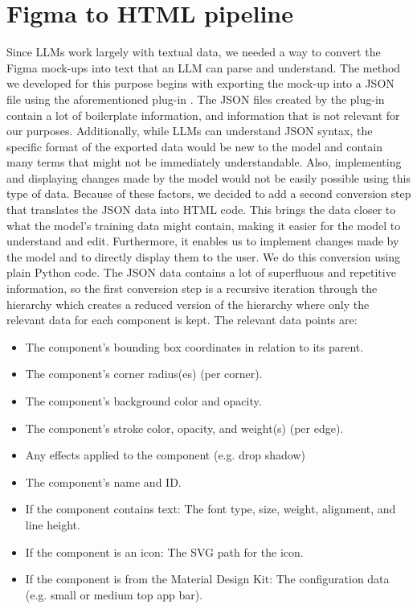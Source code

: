 \documentclass[11pt,titlepage,oneside,openany]{book}
\begin{document}
\section{Figma to HTML pipeline}\label{sec:prep}
Since LLMs work largely with textual data, we needed a way to convert the Figma mock-ups into text that an LLM can parse and understand. The method we developed for this purpose begins with exporting the mock-up into a JSON file using the aforementioned plug-in \cite{noauthor_json_nodate}. The JSON files created by the plug-in contain a lot of boilerplate information, and information that is not relevant for our purposes. Additionally, while LLMs can understand JSON syntax, the specific format of the exported data would be new to the model and contain many terms that might not be immediately understandable. Also, implementing and displaying changes made by the model would not be easily possible using this type of data. Because of these factors, we decided to add a second conversion step that translates the JSON data into HTML code. This brings the data closer to what the model's training data might contain, making it easier for the model to understand and edit. Furthermore, it enables us to implement changes made by the model and to directly display them to the user. We do this conversion using plain Python code. The JSON data contains a lot of superfluous and repetitive information, so the first conversion step is a recursive iteration through the hierarchy which creates a reduced version of the hierarchy where only the relevant data for each component is kept. The relevant data points are:
\begin{itemize}
	\item The component's bounding box coordinates in relation to its parent. 
	\item The component's corner radius(es) (per corner).
	\item The component's background color and opacity.
	\item The component's stroke color, opacity, and weight(s) (per edge).
	\item Any effects applied to the component (e.g. drop shadow)
	\item The component's name and ID.
	\item If the component contains text: The font type, size, weight, alignment, and line height.
	\item If the component is an icon: The SVG path for the icon.
	\item If the component is from the Material Design Kit: The configuration data (e.g. small or medium top app bar).
\end{itemize}
\end{document}
